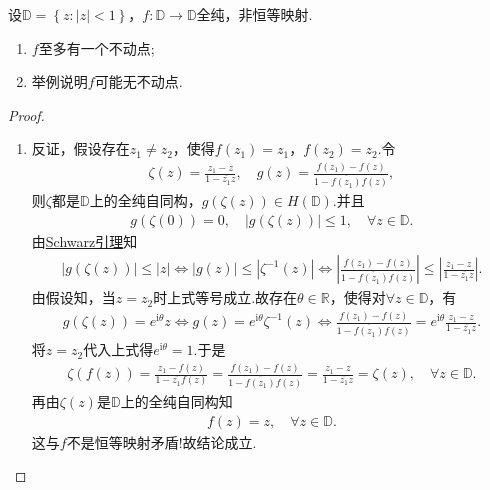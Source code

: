 \documentclass[../../main.tex]{subfiles}%
\begin{document}
\begin{example}
设$\mathbb{D} =\left\{ z:\left| z \right|<1 \right\}$，$f:\mathbb{D} \rightarrow \mathbb{D}$全纯，非恒等映射.
\begin{enumerate}[(1)]
\item $f$至多有一个不动点;
\item 举例说明$f$可能无不动点.
\end{enumerate}
\end{example}
\begin{proof}
\begin{enumerate}[(1)]
\item 反证，假设存在$z_1\ne z_2$，使得$f\left( z_1 \right) =z_1$，$f\left( z_2 \right) =z_2$.令
\begin{align*}
\zeta \left( z \right) =\frac{z_1-z}{1-\overline{z_1}z},\quad g\left( z \right) =\frac{f\left( z_1 \right) -f\left( z \right)}{1-\overline{f\left( z_1 \right) }f\left( z \right)},
\end{align*}
则$\zeta $都是$\mathbb{D}$上的全纯自同构，$g\left( \zeta \left( z \right) \right) \in H\left( \mathbb{D} \right)$.并且
\begin{align*}
g\left( \zeta \left( 0 \right) \right) =0,\quad \left| g\left( \zeta \left( z \right) \right) \right|\leqslant 1,\quad \forall z\in \mathbb{D}.
\end{align*}
由\hyperref[theorem:Schwarz引理-定理4.5.3]{Schwarz引理}知
\begin{align*}
\left| g\left( \zeta \left( z \right) \right) \right|\leqslant \left| z \right|\Longleftrightarrow \left| g\left( z \right) \right|\leqslant \left| \zeta ^{-1}\left( z \right) \right|\Longleftrightarrow \left| \frac{f\left( z_1 \right) -f\left( z \right)}{1-\overline{f\left( z_1 \right) }f\left( z \right)} \right|\leqslant \left| \frac{z_1-z}{1-\overline{z_1}z} \right|.
\end{align*}
由假设知，当$z=z_2$时上式等号成立.故存在$\theta \in \mathbb{R}$，使得对$\forall z\in \mathbb{D}$，有
\begin{align*}
g\left( \zeta \left( z \right) \right) =e^{\mathrm{i}\theta}z\Longleftrightarrow g\left( z \right) =e^{\mathrm{i}\theta}\zeta ^{-1}\left( z \right)\Longleftrightarrow \frac{f\left( z_1 \right) -f\left( z \right)}{1-\overline{f\left( z_1 \right) }f\left( z \right)}=e^{\mathrm{i}\theta}\frac{z_1-z}{1-\overline{z_1}z}.
\end{align*}
将$z=z_2$代入上式得$e^{\mathrm{i}\theta}=1$.于是
\begin{align*}
\zeta \left( f\left( z \right) \right) =\frac{z_1-f\left( z \right)}{1-\overline{z_1}f\left( z \right)}=\frac{f\left( z_1 \right) -f\left( z \right)}{1-\overline{f\left( z_1 \right) }f\left( z \right)}=\frac{z_1-z}{1-\overline{z_1}z}=\zeta \left( z \right) ,\quad \forall z\in \mathbb{D} .
\end{align*}
再由$\zeta \left( z \right)$是$\mathbb{D}$上的全纯自同构知
\begin{align*}
f\left( z \right) =z,\quad \forall z\in \mathbb{D} .
\end{align*}
这与$f$不是恒等映射矛盾!故结论成立.


\end{enumerate}
\end{proof}
\end{document}
